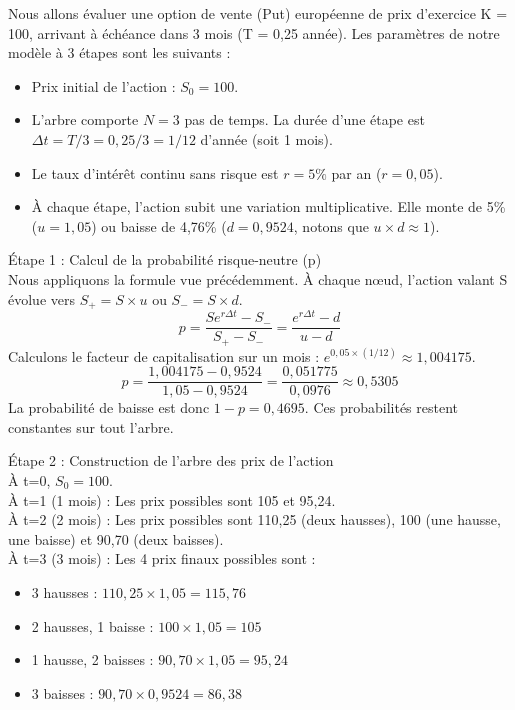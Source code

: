 \begin{examplebox}
Nous allons évaluer une option de vente (Put) européenne de prix d'exercice K = 100, arrivant à échéance dans 3 mois (T = 0,25 année). 
Les paramètres de notre modèle à 3 étapes sont les suivants :
\begin{itemize}[label=$\cdot$]
    \item Prix initial de l'action : $S_0 = 100$.
    \item L'arbre comporte $N = 3$ pas de temps. La durée d'une étape est $\Delta t = T / 3 = 0,25 / 3 = 1/12$ d'année (soit 1 mois).
    \item Le taux d'intérêt continu sans risque est $r = 5\%$ par an ($r = 0,05$).
    \item À chaque étape, l'action subit une variation multiplicative. Elle monte de 5\% ($u = 1,05$) ou baisse de 4,76\% ($d = 0,9524$, notons que $u \times d \approx 1$).
\end{itemize}

Étape 1 : Calcul de la probabilité risque-neutre (p)\\
Nous appliquons la formule vue précédemment. À chaque nœud, l'action valant S évolue vers $S_+ = S \times u$ ou $S_- = S \times d$.
\begin{equation}
    \label{eq:fsec3-ex_proba_rn}
    p = \frac{S e^{r\Delta t} - S_-}{S_+ - S_-} = \frac{e^{r\Delta t} - d}{u - d}
\end{equation}
Calculons le facteur de capitalisation sur un mois : $e^{0,05 \times (1/12)} \approx 1,004175$.
\begin{equation}
    \label{eq:fsec3-ex_proba_calc}
    p = \frac{1,004175 - 0,9524}{1,05 - 0,9524} = \frac{0,051775}{0,0976} \approx 0,5305
\end{equation}
La probabilité de baisse est donc $1 - p = 0,4695$. Ces probabilités restent constantes sur tout l'arbre.

Étape 2 : Construction de l'arbre des prix de l'action\\
À t=0, $S_0 = 100$.\\
À t=1 (1 mois) : Les prix possibles sont 105 et 95,24.\\
À t=2 (2 mois) : Les prix possibles sont 110,25 (deux hausses), 100 (une hausse, une baisse) et 90,70 (deux baisses).\\
À t=3 (3 mois) : Les 4 prix finaux possibles sont :
\begin{itemize}[label=$\cdot$]
    \item 3 hausses : $110,25 \times 1,05 = 115,76$
    \item 2 hausses, 1 baisse : $100 \times 1,05 = 105$
    \item 1 hausse, 2 baisses : $90,70 \times 1,05 = 95,24$
    \item 3 baisses : $90,70 \times 0,9524 = 86,38$
\end{itemize}


\end{examplebox}
